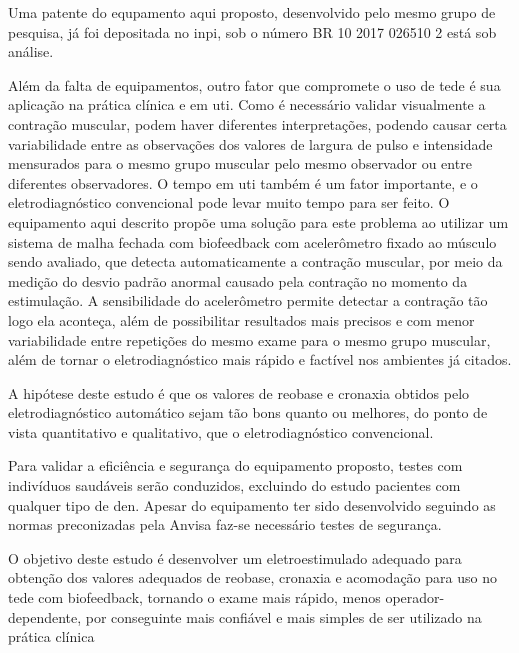 Uma patente do equpamento aqui proposto, desenvolvido pelo mesmo grupo de pesquisa, já foi depositada no \ac{inpi}, sob o número BR 10 2017 026510 2 está sob análise.

Além da falta de equipamentos, outro fator que compromete o uso de \ac{tede} é sua aplicação na prática clínica e em \ac{uti}. Como é necessário validar visualmente a contração muscular, podem haver diferentes interpretações, podendo causar certa variabilidade entre as observações dos valores de largura de pulso e intensidade mensurados para o mesmo grupo muscular pelo mesmo observador ou entre diferentes observadores. O tempo em \ac{uti} também é um fator importante, e o eletrodiagnóstico convencional pode levar muito tempo para ser feito. O equipamento aqui descrito propõe uma solução para este problema ao utilizar um sistema de malha fechada com biofeedback com acelerômetro fixado ao músculo sendo avaliado, que detecta automaticamente a contração muscular, por meio da medição do desvio padrão anormal causado pela contração no momento da estimulação. A sensibilidade do acelerômetro permite detectar a contração tão logo ela aconteça, além de possibilitar resultados mais precisos e com menor variabilidade entre repetições do mesmo exame para o mesmo grupo muscular, além de tornar o eletrodiagnóstico mais rápido e factível nos ambientes já citados. 

A hipótese deste estudo é que os valores de reobase e cronaxia obtidos pelo eletrodiagnóstico automático sejam tão bons quanto ou melhores, do ponto de vista quantitativo e qualitativo, que o eletrodiagnóstico convencional.

Para validar a eficiência e segurança do equipamento proposto, testes com indivíduos saudáveis serão conduzidos, excluindo do estudo pacientes com qualquer tipo de \ac{den}. Apesar do equipamento ter sido desenvolvido seguindo as normas preconizadas pela Anvisa faz-se necessário testes de segurança.

O objetivo deste estudo é desenvolver um eletroestimulado adequado para obtenção dos valores adequados de reobase, cronaxia e acomodação para uso no \ac{tede} com biofeedback, tornando o exame mais rápido, menos operador-dependente, por conseguinte mais confiável e mais simples de ser utilizado na prática clínica



